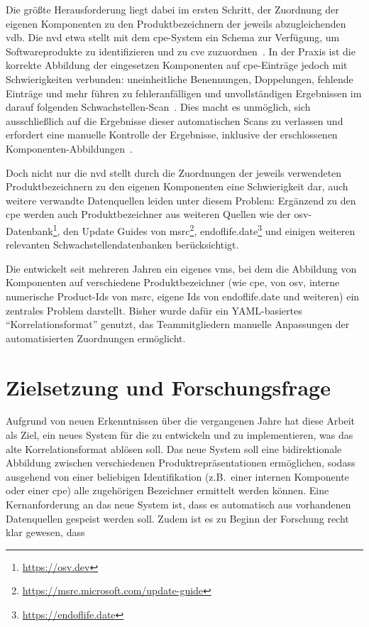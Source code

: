 Die größte Herausforderung liegt dabei im ersten Schritt, der Zuordnung der eigenen Komponenten zu den Produktbezeichnern der jeweils abzugleichenden \acrshort{vdb}.
Die \acrshort{nvd} etwa stellt mit dem \acrfull{cpe}-System ein Schema zur Verfügung, um Softwareprodukte zu identifizieren und zu \acrshort{cve} zuzuordnen\ \autocite{Cheikes_Waltermire_Scarfone_2011}.
In der Praxis ist die korrekte Abbildung der eingesetzen Komponenten auf \acrshort{cpe}-Einträge jedoch mit Schwierigkeiten verbunden:
uneinheitliche Benennungen, Doppelungen, fehlende Einträge und mehr führen zu fehleranfälligen und unvollständigen Ergebnissen im darauf folgenden Schwachstellen-Scan\ \autocite{Sanguino_Uetz_2017}.
Dies macht es unmöglich, sich ausschließlich auf die Ergebnisse dieser automatischen Scans zu verlassen und erfordert eine manuelle Kontrolle der Ergebnisse, inklusive der erschlossenen Komponenten-Abbildungen\ \autocite{Sanguino_Uetz_2017}.

Doch nicht nur die \acrshort{nvd} stellt durch die Zuordnungen der jeweils verwendeten Produktbezeichnern zu den eigenen Komponenten eine Schwierigkeit dar, auch weitere verwandte Datenquellen leiden unter diesem Problem:
Ergänzend zu den \acrshort{cpe} werden auch Produktbezeichner aus weiteren Quellen wie der \acrfull{osv}-Datenbank\footnote{\url{https://osv.dev}}, den Update Guides von \acrfull{msrc}\footnote{\url{https://msrc.microsoft.com/update-guide}}, endoflife.date\footnote{\url{https://endoflife.date}} und einigen weiteren relevanten Schwachstellendatenbanken berücksichtigt.

Die \metaeffekt entwickelt seit mehreren Jahren ein eigenes \acrshort{vms}, bei dem die Abbildung von Komponenten auf verschiedene Produktbezeichner (wie \acrshort{cpe},  von \acrshort{osv}, interne numerische Product-Ids von \acrshort{msrc}, eigene Ids von endoflife.date und weiteren) ein zentrales Problem darstellt.
Bisher wurde dafür ein YAML-basiertes \enquote{Korrelationsformat} genutzt, das Teammitgliedern manuelle Anpassungen der automatisierten Zuordnungen ermöglicht.


\section{Zielsetzung und Forschungsfrage}\label{sec:ziel-forschungsfrage}

Aufgrund von neuen Erkenntnissen über die vergangenen Jahre hat diese Arbeit als Ziel, ein neues System für die \metaeffekt zu entwickeln und zu implementieren, was das alte Korrelationsformat ablösen soll.
Das neue System soll eine bidirektionale Abbildung zwischen verschiedenen Produktrepräsentationen ermöglichen, sodass ausgehend von einer beliebigen Identifikation (z.B.\ einer internen Komponente oder einer \acrshort{cpe}) alle zugehörigen Bezeichner ermittelt werden können.
Eine Kernanforderung an das neue System ist, dass es automatisch aus vorhandenen Datenquellen gespeist werden soll.
Zudem ist es zu Beginn der Forschung recht klar gewesen, dass

